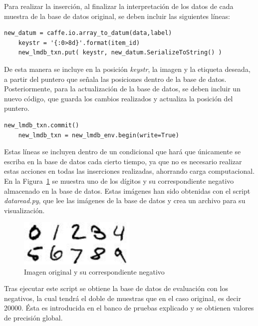 Para realizar la inserción, al finalizar la interpretación de los datos de cada muestra de la base de datos original, se deben incluir las siguientes líneas:
\vspace{10pt}
\begin{lstlisting}[frame=single]
	new_datum = caffe.io.array_to_datum(data,label)
	keystr = '{:0>8d}'.format(item_id)
	new_lmdb_txn.put( keystr, new_datum.SerializeToString() )
\end{lstlisting}
De esta manera se incluye en la posición \textit{keystr}, la imagen y la etiqueta deseada, a partir del puntero que señala las posiciones dentro de la base de datos.\\

Posteriormente, para la actualización de la base de datos, se deben incluir un nuevo código, que guarda los cambios realizados y actualiza la posición del puntero.
\vspace{10pt}
\begin{lstlisting}[frame=single]
	new_lmdb_txn.commit()
	new_lmdb_txn = new_lmdb_env.begin(write=True)
\end{lstlisting}
Estas líneas se incluyen dentro de un condicional que hará que únicamente se escriba en la base de datos cada cierto tiempo, ya que no es necesario realizar estas acciones en todas las inserciones realizadas, ahorrando carga computacional.\\

En la Figura~\ref{fig.neg} se muestra uno de los dígitos y su correspondiente negativo almacenado en la base de datos. Estas imágenes han sido obtenidas con el script \textit{dataread.py}, que lee las imágenes de la base de datos y crea un archivo para su visualización.\\

\begin{figure}[H]
	\begin{center}
		\includegraphics[width=0.5\textwidth]{figures/negativo}
		\caption{Imagen original y su correspondiente negativo}
		\label{fig.neg}
	\end{center}
\end{figure}

Tras ejecutar este script se obtiene la base de datos de evaluación con los negativos, la cual tendrá el doble de muestras que en el caso original, es decir 20000. Ésta es introducida en el banco de pruebas explicado y se obtienen valores de precisión global.\\


